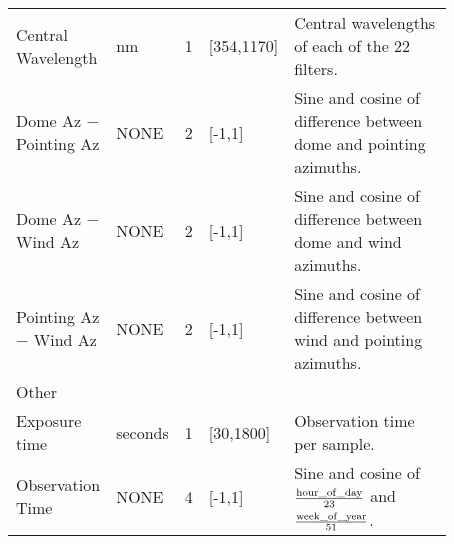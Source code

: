 \begin{table*}
\begin{tabular}{p{0.15\linewidth} p{0.095\linewidth}p{0.05\linewidth} p{0.125\linewidth}p{0.45\linewidth}}
Central Wavelength & nm & 1 & [354,1170] & Central wavelengths of each of the 22 filters.\\
Dome Az $-$ Pointing Az & NONE & 2 & [-1,1] & Sine and cosine of difference between dome and pointing azimuths.\\
Dome Az $-$ Wind Az & NONE & 2 & [-1,1] & Sine and cosine of difference between dome and wind azimuths.\\
Pointing Az $-$ Wind Az & NONE & 2 & [-1,1] & Sine and cosine of difference between wind and pointing azimuths.\\
\midrule
\multicolumn{5}{l}{Other} \\ \midrule
Exposure time & seconds & 1 & [30,1800] & Observation time per sample.\\
Observation Time & NONE & 4 & [-1,1] & Sine and cosine of $\frac{\rm{hour\_of\_day}}{23}$ and $\frac{\rm{week\_of\_year}}{51}$.\\
\bottomrule
\end{tabular}
\end{table*}


